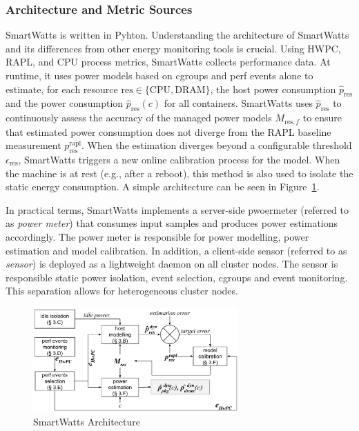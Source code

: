\subsubsection{Architecture and Metric Sources}
\label{sec:smartwatts-architecture}
SmartWatts is written in Pyhton. Understanding the architecture of SmartWatts and its differences from other energy monitoring tools is crucial. Using HWPC, RAPL, and CPU process metrics, SmartWatts collects performance data. At runtime, it uses power models based on cgroups and perf events alone to estimate, for each resource $\text{res} \in \{\text{CPU}, \text{DRAM}\}$, the host power consumption $\hat{p}_{\text{res}}$ and the power consumption $\hat{p}_{\text{res}}(c)$ for all containers. SmartWatts uses $\hat{p}_{\text{res}}$ to continuously assess the accuracy of the managed power models $M_{\text{res}, f}$ to ensure that estimated power consumption does not diverge from the RAPL baseline measurement $p_{\text{res}}^{\text{rapl}}$. When the estimation diverges beyond a configurable threshold $\epsilon_{\text{res}}$, SmartWatts triggers a new online calibration process for the model. When the machine is at rest (e.g., after a reboot), this method is also used to isolate the static energy consumption. A simple architecture can be seen in Figure~\ref{fig:smartwatts_architecture}.

In practical terms, SmartWatts implements a server-side pwoermeter (referred to as \textit{power meter}) that consumes input samples and produces power estimations accordingly. The power meter is responsible for power modelling, power estimation and model calibration. In addition, a client-side sensor (referred to as \textit{sensor}) is deployed as a lightweight daemon on all cluster nodes. The sensor is responsible static power isolation, event selection, cgroups and event monitoring. This separation allows for heterogeneous cluster nodes.

\begin{figure}[ht]
    \centering
    \includegraphics[width=0.7\textwidth]{Figures/smartwatts_architecture.png}
    \caption[SmartWatts architecture]{SmartWatts Architecture}
    \label{fig:smartwatts_architecture}
\end{figure}
